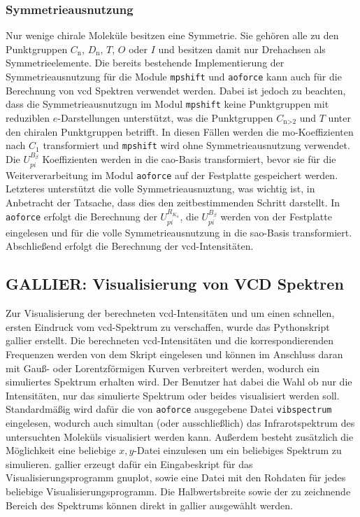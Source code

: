 	
	\subsubsection{Symmetrieausnutzung}
	Nur wenige chirale Moleküle besitzen eine Symmetrie. Sie gehören alle zu den Punktgruppen $C_{\textrm{n}}$, $D_{\textrm{n}}$, $T$, $O$ oder $I$ und besitzen damit nur Drehachsen als Symmetrieelemente. Die bereits bestehende Implementierung der Symmetrieausnutzung\supercite{haser1991molecular} für die Module \texttt{mpshift} und \texttt{aoforce} kann auch für die Berechnung von \ac{vcd} Spektren verwendet werden. Dabei ist jedoch zu beachten, dass die Symmetrieausnutzugn im Modul \texttt{mpshift} keine Punktgruppen mit reduziblen $e$-Darstellungen unterstützt, was die Punktgruppen $C_{\textrm{n>2}}$ und $T$ unter den chiralen Punktgruppen betrifft. In diesen Fällen werden die \ac{mo}-Koeffizienten nach $C_1$ transformiert und \texttt{mpshift} wird ohne Symmetrieausnutzung verwendet. Die $U_{pi}^{B_\beta}$ Koeffizienten werden in die \ac{cao}-Basis transformiert, bevor sie für die Weiterverarbeitung im Modul \texttt{aoforce} auf der Festplatte gespeichert werden. Letzteres unterstützt die volle Symmetrieausnuztung, was wichtig ist, in Anbetracht der Tatsache, dass dies den zeitbestimmenden Schritt darstellt. In \texttt{aoforce} erfolgt die Berechnung der $U_{pi}^{R_{K_\alpha}}$, die $U_{pi}^{B_\beta}$ werden von der Festplatte eingelesen und für die volle Symmetrieausnutzung in die \ac{sao}-Basis transformiert. Abschließend erfolgt die Berechnung der \ac{vcd}-Intensitäten. 
	\subsection{GALLIER: Visualisierung von VCD Spektren}
	Zur Visualisierung der berechneten \ac{vcd}-Intensitäten und um einen schnellen, ersten Eindruck vom \ac{vcd}-Spektrum zu verschaffen, wurde das Pythonskript \ac{gallier} erstellt. Die berechneten \ac{vcd}-Intensitäten und die korrespondierenden Frequenzen werden von dem Skript eingelesen und können im Anschluss daran mit Gauß- oder Lorentzförmigen Kurven verbreitert werden, wodurch ein simuliertes Spektrum erhalten wird. Der Benutzer hat dabei die Wahl ob nur die Intensitäten, nur das simulierte Spektrum oder beides visualisiert werden soll. Standardmäßig wird dafür die von \texttt{aoforce} ausgegebene Datei \texttt{vibspectrum} eingelesen, wodurch auch simultan (oder ausschließlich) das Infrarotspektrum des untersuchten Moleküls visualisiert werden kann. Außerdem besteht zusätzlich die Möglichkeit eine beliebige $x,y$-Datei einzulesen um ein beliebiges Spektrum zu simulieren. \ac{gallier} erzeugt dafür ein Eingabeskript für das Visualisierungsprogramm gnuplot\supercite{gnuplot}, sowie eine Datei mit den Rohdaten für jedes beliebige Visualisierungsprogramm. Die Halbwertsbreite sowie der zu zeichnende Bereich des Spektrums können direkt in \ac{gallier} ausgewählt werden.

